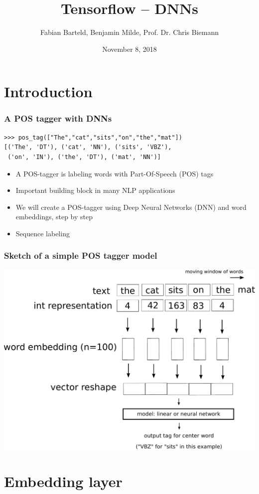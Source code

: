 \documentclass{beamer}
\title{Tensorflow -- DNNs}
\author{Fabian Barteld, Benjamin Milde, Prof. Dr. Chris Biemann}
\date[8.11.2018]{November 8, 2018}
\begin{document}
\maketitle


\section{Introduction}

\begin{frame}[fragile]
\frametitle{A POS tagger with DNNs}

\begin{lstlisting}
>>> pos_tag(["The","cat","sits","on","the","mat"])
[('The', 'DT'), ('cat', 'NN'), ('sits', 'VBZ'),
 ('on', 'IN'), ('the', 'DT'), ('mat', 'NN')]
\end{lstlisting}

\begin{itemize}
\item A POS-tagger is labeling words with Part-Of-Speech (POS) tags
\item Important building block in many NLP applications
\item We will create a POS-tagger using Deep Neural Networks (DNN) and word embeddings, step by step
\item Sequence labeling
\end{itemize}

\end{frame}

\begin{frame}[fragile]
\frametitle{Sketch of a simple POS tagger model}
 \includegraphics[height=30ex]{postagger1.pdf}
\end{frame}

\section{Embedding layer}
\end{document}
